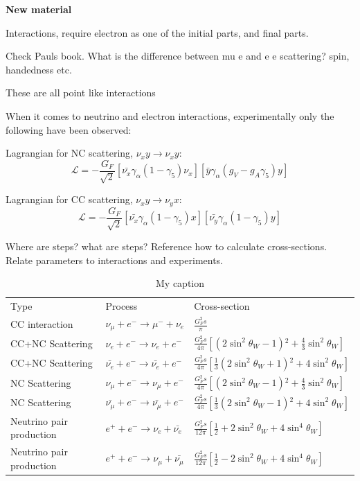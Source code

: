 \textbf{New material}

Interactions, require electron as one of the initial parts, and final parts.

Check Pauls book. What is the difference between mu e and e e scattering? spin, handedness etc.

These are all point like interactions

When it comes to neutrino and electron interactions, experimentally only the following have been observed:

Lagrangian for NC scattering, $\nu_x y \rightarrow \nu_x y$:
\begin{equation}
\mathcal{L}=-\frac{G_F}{\sqrt{2}} \left[ \bar{\nu_x}\gamma_\alpha (1-\gamma_5)\nu_x \right] \left[ \bar{y} \gamma_\alpha (g_V-g_A \gamma_5)y \right]
\end{equation}

Lagrangian for CC scattering, $\nu_x y \rightarrow \nu_y x$:
\begin{equation}
\mathcal{L}=-\frac{G_F}{\sqrt{2}} \left[ \bar{\nu_x}\gamma_\alpha (1-\gamma_5)x\right] \left[ \bar{\nu_y}\gamma_\alpha (1-\gamma_5)y \right]
\end{equation}

Where are steps? what are steps? Reference how to calculate cross-sections. Relate parameters to interactions and experiments.

\begin{table}[h!]
\centering
\caption{My caption}
\label{my-label}
\begin{tabular}{|l|l|l|}
 \hline
Type & Process & Cross-section \\
CC interaction & $\nu_\mu + e^- \rightarrow \mu^- + \nu_e$  & $\frac{G_F^2 s}{\pi}$\\
CC+NC Scattering & $\nu_e + e^- \rightarrow \nu_e + e^-$ & $\frac{G_F^2 s}{4\pi} \left[ (2\sin^2 \theta_W -1){}^2 +\frac{4}{3}\sin^2 \theta_W \right]$\\ 
CC+NC Scattering & $\bar{\nu_e} + e^- \rightarrow \bar{\nu_e} + e^-$ & $\frac{G_F^2 s}{4\pi} \left[ \frac{1}{3}(2\sin^2 \theta_W +1){}^2 +4\sin^2 \theta_W \right]$ \\
NC Scattering & $\nu_\mu + e^- \rightarrow \nu_\mu + e^-$ & $\frac{G_F^2 s}{4\pi} \left[ (2\sin^2 \theta_W -1){}^2 +\frac{4}{3}\sin^2 \theta_W \right]$ \\
NC Scattering & $\bar{\nu_\mu} + e^- \rightarrow \bar{\nu_\mu} + e^-$ &$\frac{G_F^2 s}{4\pi} \left[ \frac{1}{3}(2\sin^2 \theta_W -1){}^2 +4\sin^2 \theta_W \right]$ \\
Neutrino pair production & $e^+ + e^- \rightarrow \nu_e + \bar{\nu_e}$ & $\frac{G_F^2 s}{12\pi} \left[ \frac{1}{2} + 2\sin^2 \theta_W + 4\sin^4 \theta_W \right]$ \\
Neutrino pair production & $e^+ + e^- \rightarrow \nu_\mu + \bar{\nu_\mu}$ & $\frac{G_F^2 s}{12\pi} \left[ \frac{1}{2} - 2\sin^2 \theta_W + 4\sin^4 \theta_W \right]$ \\
 \hline
\end{tabular}
\end{table}

